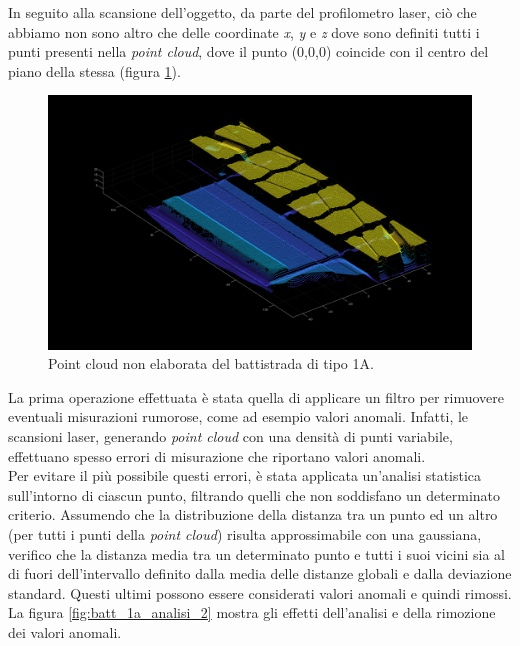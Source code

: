 \noindent In seguito alla scansione dell'oggetto, da parte del profilometro laser, ciò che abbiamo non sono altro che delle coordinate \textit{x}, \textit{y} e \textit{z} dove sono definiti tutti i punti presenti nella \textit{point cloud}, dove il punto (0,0,0) coincide con il centro del piano della stessa (figura \ref{fig:batt_1a_analisi_1}).\\

\begin{figure}[H]
	\centering
	\includegraphics[width=0.8\columnwidth]{./pictures/batt_1a_analisi_1.png}
	\caption{Point cloud non elaborata del battistrada di tipo 1A.}\label{fig:batt_1a_analisi_1}
\end{figure}

\noindent La prima operazione effettuata è stata quella di applicare un filtro per rimuovere eventuali misurazioni rumorose, come ad esempio valori anomali. Infatti, le scansioni laser, generando \textit{point cloud} con una densità di punti variabile, effettuano spesso errori di misurazione che riportano valori anomali.\\
\newline
Per evitare il più possibile questi errori, è stata applicata un'analisi statistica sull'intorno di ciascun punto, filtrando quelli che non soddisfano un determinato criterio. Assumendo che la distribuzione della distanza tra un punto ed un altro (per tutti i punti della \textit{point cloud}) risulta approssimabile con una gaussiana, verifico che la distanza media tra un determinato punto e tutti i suoi vicini sia al di fuori dell'intervallo definito dalla media delle distanze globali e dalla deviazione standard. Questi ultimi possono essere considerati valori anomali e quindi rimossi.\\
\newline
La figura \ref{fig:batt_1a_analisi_2} mostra gli effetti dell'analisi e della rimozione dei valori anomali.

